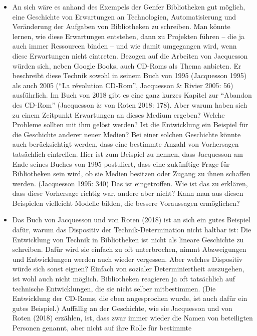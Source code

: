 \documentclass[a4paper,
fontsize=11pt,
oneside,
numbers=noperiodatend,
parskip=half-,
bibliography=totoc,
final
]{scrartcl}
\begin{document}
\begin{itemize}
\item
  An sich wäre es anhand des Exempels der Genfer Bibliotheken gut
  möglich, eine Geschichte von Erwartungen an Technologien,
  Automatisierung und Veränderung der Aufgaben von Bibliotheken zu
  schreiben. Man könnte lernen, wie diese Erwartungen entstehen, dann zu
  Projekten führen -- die ja auch immer Ressourcen binden -- und wie
  damit umgegangen wird, wenn diese Erwartungen nicht eintreten. Bezogen
  auf die Arbeiten von Jacquesson würden sich, neben Google Books, auch
  CD-Roms als Thema anbieten. Er beschreibt diese Technik sowohl in
  seinem Buch von 1995 (Jacquesson 1995) als auch 2005 (\enquote{La
  révolution CD-Rom}, Jacquesson \& Rivier 2005: 56) ausführlich. Im
  Buch von 2018 gibt es eine ganz kurzes Kapitel zur \enquote{Abandon
  des CD-Rom} (Jacquesson \& von Roten 2018: 178). Aber warum haben sich
  zu einem Zeitpunkt Erwartungen an dieses Medium ergeben? Welche
  Probleme sollten mit ihm gelöst werden? Ist die Entwicklung ein
  Beispiel für die Geschichte anderer neuer Medien? Bei einer solchen
  Geschichte könnte auch berücksichtigt werden, dass eine bestimmte
  Anzahl von Vorhersagen tatsächlich eintreffen. Hier ist zum Beispiel
  zu nennen, dass Jacquesson am Ende seines Buches von 1995 postuliert,
  dass eine zukünftige Frage für Bibliotheken sein wird, ob sie Medien
  besitzen oder Zugang zu ihnen schaffen werden. (Jacquesson 1995: 340)
  Das ist eingetroffen. Wie ist das zu erklären, dass diese Vorhersage
  richtig war, andere aber nicht? Kann man aus diesen Beispielen
  vielleicht Modelle bilden, die bessere Voraussagen ermöglichen?
\item
  Das Buch von Jacquesson und von Roten (2018) ist an sich ein gutes
  Beispiel dafür, warum das Dispositiv der Technik-Determination nicht
  haltbar ist: Die Entwicklung von Technik in Bibliotheken ist nicht als
  lineare Geschichte zu schreiben. Dafür wird sie einfach zu oft
  unterbrochen, nimmt Abzweigungen und Entwicklungen werden auch wieder
  vergessen. Aber welches Dispositiv würde sich sonst eignen? Einfach
  von sozialer Determiniertheit auszugehen, ist wohl auch nicht möglich.
  Bibliotheken reagieren ja oft tatsächlich auf technische
  Entwicklungen, die sie nicht selber mitbestimmen. (Die Entwicklung der
  CD-Roms, die eben angesprochen wurde, ist auch dafür ein gutes
  Beispiel.) Auffällig an der Geschichte, wie sie Jacquesson und von
  Roten (2018) erzählen, ist, dass zwar immer wieder die Namen von
  beteiligten Personen genannt, aber nicht auf ihre Rolle für bestimmte

\end{itemize}
\end{document}
